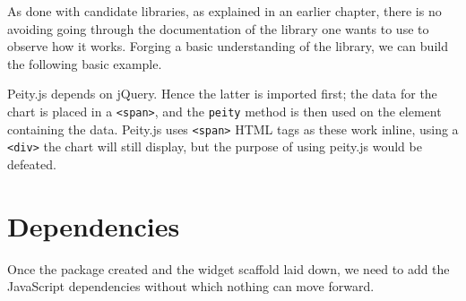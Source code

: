 \documentclass[10pt,]{krantz}
\makeatletter
\newenvironment{Shaded}{\begin{snugshade}}{\end{snugshade}}
\newcommand{\AttributeTok}[1]{\textcolor[rgb]{0.61,0.61,0.61}{#1}}
\newcommand{\CommentTok}[1]{\textcolor[rgb]{0.37,0.37,0.37}{\textit{#1}}}
\newcommand{\DataTypeTok}[1]{\textcolor[rgb]{0.27,0.27,0.27}{#1}}
\newcommand{\KeywordTok}[1]{\textcolor[rgb]{0.27,0.27,0.27}{\textbf{#1}}}
\newcommand{\NormalTok}[1]{#1}
\newcommand{\OperatorTok}[1]{\textcolor[rgb]{0.43,0.43,0.43}{\textbf{#1}}}
\newcommand{\OtherTok}[1]{\textcolor[rgb]{0.37,0.37,0.37}{#1}}
\newcommand{\StringTok}[1]{\textcolor[rgb]{0.5,0.5,0.5}{#1}}
\newenvironment{kframe}{%
\medskip{}
\setlength{\fboxsep}{.8em}
 \def\at@end@of@kframe{}%
 \ifinner\ifhmode%
  \def\at@end@of@kframe{\end{minipage}}%
  \begin{minipage}{\columnwidth}%
 \fi\fi%
 \def\FrameCommand##1{\hskip\@totalleftmargin \hskip-\fboxsep
 \colorbox{shadecolor}{##1}\hskip-\fboxsep
     \hskip-\linewidth \hskip-\@totalleftmargin \hskip\columnwidth}%
 \MakeFramed {\advance\hsize-\width
   \@totalleftmargin\z@ \linewidth\hsize
   \@setminipage}}%
 {\par\unskip\endMakeFramed%
 \at@end@of@kframe}
\renewenvironment{Shaded}{\begin{kframe}}{\end{kframe}}
\makeatother
\begin{document}
As done with candidate libraries, as explained in an earlier chapter, there is no avoiding going through the documentation of the library one wants to use to observe how it works. Forging a basic understanding of the library, we can build the following basic example.

\begin{Shaded}
\end{Shaded}

Peity.js depends on jQuery. Hence the latter is imported first; the data for the chart is placed in a \texttt{\textless{}span\textgreater{}}, and the \texttt{peity} method is then used on the element containing the data. Peity.js uses \texttt{\textless{}span\textgreater{}} HTML tags as these work inline, using a \texttt{\textless{}div\textgreater{}} the chart will still display, but the purpose of using peity.js would be defeated.

\hypertarget{widgets-realistic-deps}{%
\section{Dependencies}\label{widgets-realistic-deps}}

Once the package created and the widget scaffold laid down, we need to add the JavaScript dependencies without which nothing can move forward.
\end{document}
